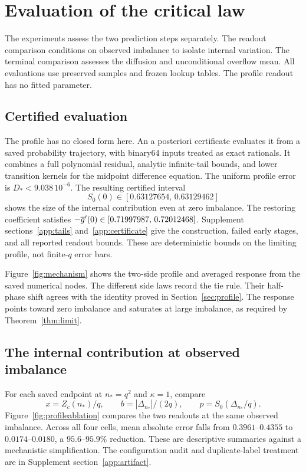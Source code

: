 \section{Evaluation of the critical law}\label{sec:experiments}
The experiments assess the two prediction steps separately.
The readout comparison conditions on observed imbalance to isolate internal
variation. The terminal comparison assesses the diffusion and unconditional
overflow mean. All evaluations use preserved samples and frozen lookup tables.
The profile readout has no fitted parameter.

\subsection{Certified evaluation}\label{sec:numerics}
The profile has no closed form here. An a posteriori certificate evaluates it from
a saved probability trajectory, with binary64 inputs treated as exact rationals.
It combines a full polynomial residual, analytic infinite-tail bounds, and
lower transition kernels for the midpoint difference equation.
The uniform profile error is $D_*<9.038\,10^{-6}$.
The resulting certified interval
\[
 S_0(0)\in[0.63127654,\,0.63129462]
\]
shows the size of the internal contribution even at zero imbalance.
The restoring coefficient satisfies
$-\overline g'(0)\in[0.71997987,\,0.72012468]$.
Supplement sections~\ref*{app:tails} and~\ref*{app:certificate} give the
construction, failed early stages, and all reported readout bounds.
These are deterministic bounds on the limiting profile, not finite-$q$ error bars.

Figure~\ref{fig:mechanism} shows the two-side profile and averaged response
from the saved numerical nodes. The different side laws record the tie rule.
Their half-phase shift agrees with the identity proved in
Section~\ref{sec:profile}. The response points toward zero imbalance and
saturates at large imbalance, as required by Theorem~\ref{thm:limit}.


\subsection{The internal contribution at observed imbalance}\label{sec:ablation}
For each saved endpoint at $n_*=q^2$ and $\kappa=1$, compare
\[
 x=Z_c(n_*)/q,\qquad b=|\Delta_{n_*}|/(2q),\qquad
 p=S_0(\Delta_{n_*}/q).
\]
Figure~\ref{fig:profileablation} compares the two readouts at the same observed
imbalance. Across all four cells, mean absolute error falls from
$0.3961$--$0.4355$ to $0.0174$--$0.0180$, a $95.6$--$95.9\%$ reduction.
These are descriptive summaries against a mechanistic simplification.
The configuration audit and duplicate-label treatment are in Supplement
section~\ref*{app:artifact}.

